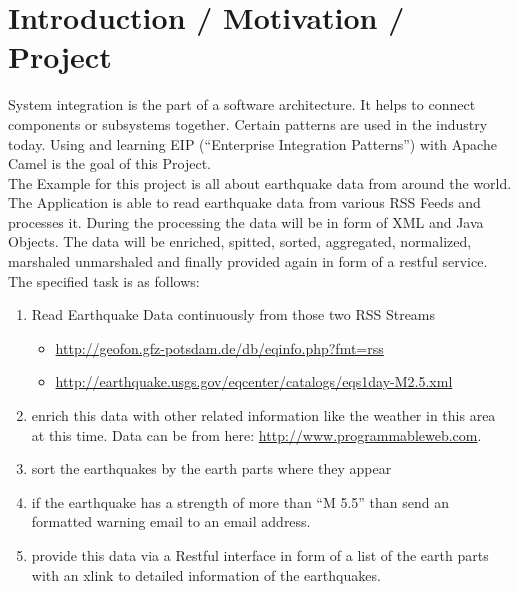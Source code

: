 \documentclass[11pt,english,ngerman, headsepline]{scrreprt}
\begin{document}


\tableofcontents{}

\pagestyle{scrheadings}    %



\chapter{Introduction / Motivation / Project}
 
System integration is the part of a software architecture. It helps to connect components or
subsystems together. Certain patterns are used in the industry today. Using and learning
EIP (“Enterprise Integration Patterns”) with Apache Camel is the goal of this
Project. \\

The Example for this project is all about earthquake data from
around the world. The Application is able to read earthquake data from various RSS Feeds and processes it. During
the processing the data will be in form of XML and Java Objects. The data will be enriched,
spitted, sorted, aggregated, normalized, marshaled unmarshaled and finally provided again
in form of a restful service.\\
  
 The specified task is as follows:
 
 \begin{enumerate}
   
 
 \item Read Earthquake Data continuously from those two RSS Streams
 \begin{itemize}
  	\item \url{http://geofon.gfz-potsdam.de/db/eqinfo.php?fmt=rss}
  	\item \url{http://earthquake.usgs.gov/eqcenter/catalogs/eqs1day-M2.5.xml}
  \end{itemize}
  \item enrich this data with other related information like the weather in this
  area at this time. Data can be from here: \url{http://www.programmableweb.com}.
  \item sort the earthquakes by the earth parts where they appear
  \item if the earthquake has a strength of more than ``M 5.5'' than send an
  formatted warning email to an email address.
  \item  provide this data via a Restful interface in form of a list of the
  earth parts with an xlink to detailed information of the earthquakes.
  
 \end{enumerate}
\end{document}
